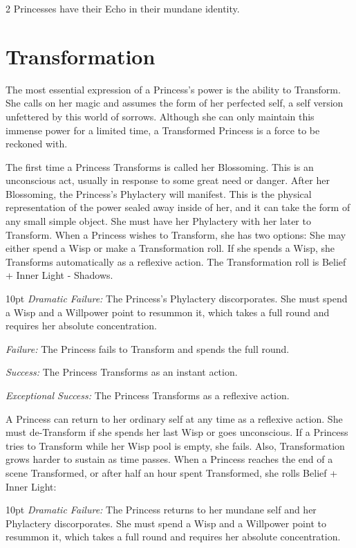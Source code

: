 \begin{multicols}{2}
Princesses have their Echo in their mundane identity. 

\section*{Transformation}
\label{sec:Transformation}
The most essential expression of a Princess's power is the ability to Transform. She calls on her magic and assumes the form of her perfected self, a self version unfettered by this world of sorrows. Although she can only maintain this immense power for a limited time, a Transformed Princess is a force to be reckoned with.

The first time a Princess Transforms is called her Blossoming. This is an unconscious act, usually in response to some great need or danger. After her Blossoming, the Princess's Phylactery will manifest. This is the physical representation of the power sealed away inside of her, and it can take the form of any small simple object. She must have her Phylactery with her later to Transform. When a Princess wishes to Transform, she has two options: She may either spend a Wisp or make a Transformation roll. If she spends a Wisp, she Transforms automatically as a reflexive action. The Transformation roll is Belief + Inner Light - Shadows. 

\begin{myindentpar}{10pt}
    \emph{Dramatic Failure:} The Princess's Phylactery discorporates. She must spend a Wisp and a Willpower point to resummon it, which takes a full round and requires her absolute concentration. 
    
    \emph{Failure:} The Princess fails to Transform and spends the full round. 
    
    \emph{Success:} The Princess Transforms as an instant action. 
    
    \emph{Exceptional Success:} The Princess Transforms as a reflexive action.
\end{myindentpar}

A Princess can return to her ordinary self at any time as a reflexive action. She must de-Transform if she spends her last Wisp or goes unconscious. If a Princess tries to Transform while her Wisp pool is empty, she fails. Also, Transformation grows harder to sustain as time passes. When a Princess reaches the end of a scene Transformed, or after half an hour spent Transformed, she rolls Belief + Inner Light: 

\begin{myindentpar}{10pt}
    \emph{Dramatic Failure:} The Princess returns to her mundane self and her Phylactery discorporates. She must spend a Wisp and a Willpower point to resummon it, which takes a full round and requires her absolute concentration. 
    

\end{myindentpar}
\end{multicols}
